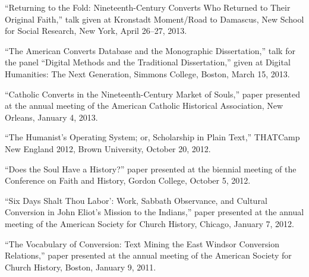 \documentclass[11pt]{article}
\begin{document}
``Returning to the Fold: Nineteenth-Century Converts Who Returned to
Their Original Faith,'' talk given at Kronstadt Moment/Road to Damascus,
New School for Social Research, New York, April 26--27, 2013.

``The American Converts Database and the Monographic Dissertation,''
talk for the panel ``Digital Methods and the Traditional Dissertation,''
given at Digital Humanities: The Next Generation, Simmons College,
Boston, March 15, 2013.

``Catholic Converts in the Nineteenth-Century Market of Souls,'' paper
presented at the annual meeting of the American Catholic Historical
Association, New Orleans, January 4, 2013.

``The Humanist's Operating System; or, Scholarship in Plain Text,'' THATCamp 
New England 2012, Brown University, October 20, 2012.

``Does the Soul Have a History?'' paper presented at the biennial
meeting of the Conference on Faith and History, Gordon College, October
5, 2012.

``Six Days Shalt Thou Labor': Work, Sabbath Observance, and Cultural
Conversion in John Eliot's Mission to the Indians,'' paper presented at
the annual meeting of the American Society for Church History, Chicago,
January 7, 2012.

``The Vocabulary of Conversion: Text Mining the East Windsor Conversion
Relations,'' paper presented at the annual meeting of the American
Society for Church History, Boston, January 9, 2011.



% 
\end{document}
